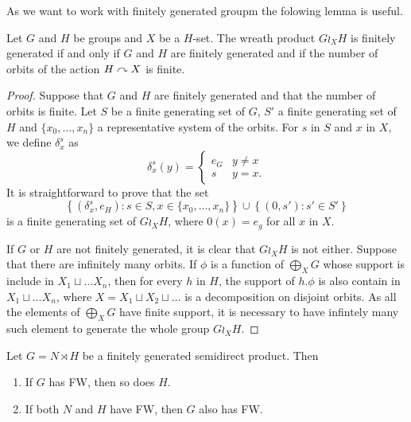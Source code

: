 As we want to work with finitely generated groupm the folowing lemma is useful.
%
%
\begin{lem}\label{L:wreath_fg}
Let $G$ and $H$ be groups and $X$ be a $H$-set. The wreath product $G \wr_X H$ is finitely generated if and only if $G$ and $H$ are finitely generated and if the number of orbits of the action $H \curvearrowright X$ is finite.
\end{lem}
%
\begin{proof}
Suppose that $G$ and $H$ are finitely generated and that the number of orbits is finite. Let $S$ be a finite generating set of $G$, $S'$ a finite generating set of $H$ and $\{x_0, \ldots, x_n \}$ a representative system of the orbits. For $s$ in $S$ and $x$ in $X$, we define $\delta_x^s$ as
%
\begin{equation*}
\delta_{x}^s (y) = \begin{cases} e_G & y \neq x \\ s 	& y = x. \end{cases}
\end{equation*}
%
It is straightforward to prove that the set 
\begin{equation*}
\left\{(\delta_x^s,e_H) : s \in S, x \in \{x_0,\ldots,x_n\} \right\} \cup \left\{ (0,s') : s' \in S' \right\}
\end{equation*}
is a finite generating set of $G \wr_X H$, where $0(x) = e_g$ for all $x$ in $X$.

If $G$ or $H$ are not finitely generated, it is clear that $G \wr_X H$ is not either. Suppose that there are infinitely many orbits. If $\phi$ is a function of $\bigoplus_X G$ whose support is include in $X_1 \sqcup \ldots X_n$, then for every $h$ in $H$, the support of $h.\phi$ is also contain in  $X_1 \sqcup \ldots X_n$, where $X = X_1 \sqcup X_2 \sqcup \ldots$ is a decomposition on disjoint orbits. As all the elements of $\bigoplus_X G$ have finite support, it is necessary to have infintely many such element to generate the whole group $G \wr_X H$.
\end{proof}
%
%
\begin{lem}\label{Lemma:Semidirect_ends}
Let $G = N \rtimes H$ be a finitely generated semidirect product. Then
\begin{enumerate}
\item If $G$ has FW, then so does $H$.
\item If both $N$ and $H$ have FW, then $G$ also has FW.
\end{enumerate}
\end{lem}
%
